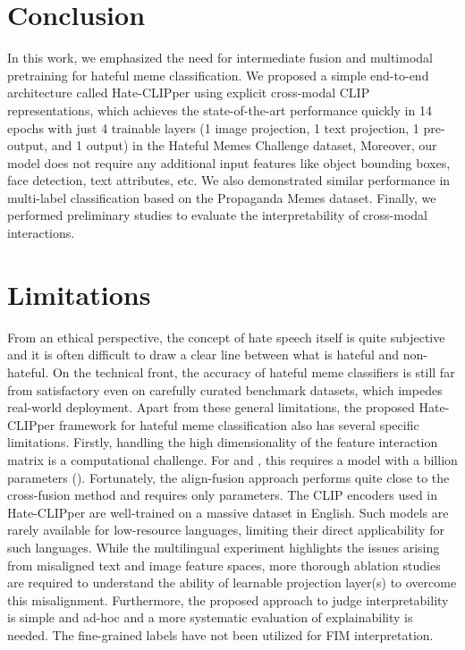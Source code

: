 \documentclass[11pt]{article}
\begin{document}
\section{Conclusion}
In this work, we emphasized the need for intermediate fusion and multimodal pretraining for hateful meme classification. We proposed a simple end-to-end architecture called Hate-CLIPper using explicit cross-modal CLIP representations, which achieves the state-of-the-art performance quickly in 14 epochs with just 4 trainable layers (1 image projection, 1 text projection, 1 pre-output, and 1 output) in the Hateful Memes Challenge dataset, Moreover, our model does not require any additional input features like object bounding boxes, face detection, text attributes, etc. We also demonstrated similar performance in multi-label classification based on the Propaganda Memes dataset. Finally, we performed preliminary studies to evaluate the interpretability of cross-modal interactions.

\section{Limitations}

From an ethical perspective, the concept of hate speech itself is quite subjective and it is often difficult to draw a clear line between what is hateful and non-hateful. On the technical front, the accuracy of hateful meme classifiers is still far from satisfactory even on carefully curated benchmark datasets, which impedes real-world deployment. Apart from these general limitations, the proposed Hate-CLIPper framework for hateful meme classification also has several specific limitations. Firstly, handling the high dimensionality of the feature interaction matrix is a computational challenge. For  and , this requires a model with a billion parameters (). Fortunately, the align-fusion approach performs quite close to the cross-fusion method and requires only  parameters. The CLIP encoders used in Hate-CLIPper are well-trained on a massive dataset in English. Such models are rarely available for low-resource languages, limiting their direct applicability for such languages. While the multilingual experiment highlights the issues arising from misaligned text and image feature spaces, more thorough ablation studies are required to understand the ability of learnable projection layer(s) to overcome this misalignment. Furthermore, the proposed approach to judge interpretability is simple and ad-hoc and a more systematic evaluation of explainability is needed. The fine-grained labels \citet{mathias-etal-2021-findings} have not been utilized for  FIM interpretation.
\clearpage
\end{document}
